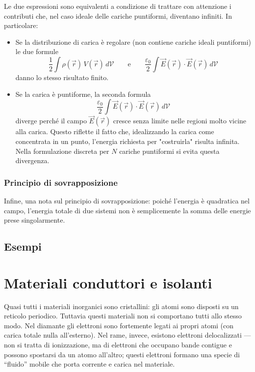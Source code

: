 \documentclass{book}
\begin{document}
Le due espressioni sono equivalenti a condizione di trattare con attenzione i contributi che, nel caso ideale delle cariche puntiformi, diventano infiniti. In particolare:
\begin{itemize}
\item Se la distribuzione di carica è regolare (non contiene cariche ideali puntiformi) le due formule
\[
\frac{1}{2}\int \rho(\vec r)\,V(\vec r)\,d\mathcal V
\qquad\text{e}\qquad
\frac{\varepsilon_0}{2}\int \vec E(\vec r)\cdot\vec E(\vec r)\,d\mathcal V
\]
danno lo stesso risultato finito.
\item Se la carica è puntiforme, la seconda formula
\[
\frac{\varepsilon_0}{2}\int \vec E(\vec r)\cdot\vec E(\vec r)\,d\mathcal V
\]
diverge perché il campo \(\vec E(\vec r)\) cresce senza limite nelle regioni molto vicine alla carica. Questo riflette il fatto che, idealizzando la carica come concentrata in un punto, l'energia richiesta per "costruirla" risulta infinita. Nella formulazione discreta per \(N\) cariche puntiformi si evita questa divergenza.
\end{itemize}

\subsection*{Principio di sovrapposizione}

Infine, una nota sul principio di sovrapposizione: poiché l'energia è quadratica nel campo, l'energia totale di due sistemi non è semplicemente la somma delle energie prese singolarmente.


\section{Esempi}

\chapter{Materiali conduttori e isolanti}

Quasi tutti i materiali inorganici sono cristallini: gli atomi sono disposti su un reticolo periodico. Tuttavia questi materiali non si comportano tutti allo stesso modo. Nel diamante gli elettroni sono fortemente legati ai propri atomi (con carica totale nulla all'esterno). Nel rame, invece, esistono elettroni delocalizzati — non si tratta di ionizzazione, ma di elettroni che occupano bande contigue e possono spostarsi da un atomo all'altro; questi elettroni formano una specie di ``fluido'' mobile che porta corrente e carica nel materiale.
\end{document}
